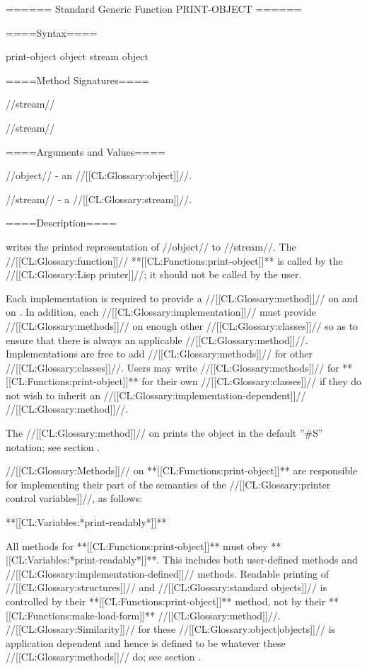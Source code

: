 ====== Standard Generic Function PRINT-OBJECT ======

====Syntax====

\DefgenWithValues print-object {object stream} {object}

====Method Signatures====

 { //stream//}

 { //stream//}

====Arguments and Values====

//object// - an //[[CL:Glossary:object]]//.

//stream// - a //[[CL:Glossary:stream]]//.


====Description====

 writes the printed representation of //object// to //stream//. The //[[CL:Glossary:function]]// **[[CL:Functions:print-object]]** is called by the //[[CL:Glossary:Lisp printer]]//; it should not be called by the user.

Each implementation is required to provide a //[[CL:Glossary:method]]// on  and on . In addition, each //[[CL:Glossary:implementation]]// must provide //[[CL:Glossary:methods]]// on enough other //[[CL:Glossary:classes]]// so as to ensure that there is always an applicable //[[CL:Glossary:method]]//. Implementations are free to add //[[CL:Glossary:methods]]// for other //[[CL:Glossary:classes]]//. Users may write //[[CL:Glossary:methods]]// for **[[CL:Functions:print-object]]** for their own //[[CL:Glossary:classes]]// if they do not wish to inherit an //[[CL:Glossary:implementation-dependent]]// //[[CL:Glossary:method]]//.

The //[[CL:Glossary:method]]// on  prints the object in the default ''#S'' notation; see section {\secref\PrintingStructures}.

//[[CL:Glossary:Methods]]// on **[[CL:Functions:print-object]]** are responsible for implementing their part of the semantics of the //[[CL:Glossary:printer control variables]]//, as follows:

\beginlist


\item{**[[CL:Variables:*print-readably*]]**}

All methods for **[[CL:Functions:print-object]]** must obey **[[CL:Variables:*print-readably*]]**. This includes both user-defined methods and //[[CL:Glossary:implementation-defined]]// methods. Readable printing of //[[CL:Glossary:structures]]// and //[[CL:Glossary:standard objects]]// is controlled by their **[[CL:Functions:print-object]]** method, not by their **[[CL:Functions:make-load-form]]** //[[CL:Glossary:method]]//. //[[CL:Glossary:Similarity]]// for these //[[CL:Glossary:object|objects]]// is application dependent and hence is defined to be whatever these //[[CL:Glossary:methods]]// do; see section {\secref\Similarity}.


